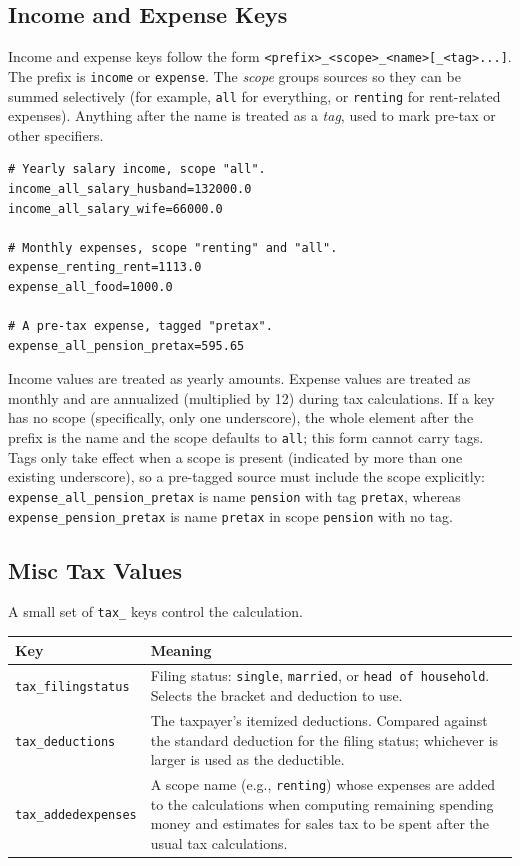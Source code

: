 \subsection{Income and Expense Keys}

Income and expense keys follow the form \texttt{<prefix>\_<scope>\_<name>[\_<tag>...]}. The prefix is \texttt{income} or \texttt{expense}. The \textit{scope} groups sources so they can be summed selectively (for example, \texttt{all} for everything, or \texttt{renting} for rent-related expenses). Anything after the name is treated as a \textit{tag}, used to mark pre-tax or other specifiers.

\begin{lstlisting}[style=pythonstyle]
# Yearly salary income, scope "all".
income_all_salary_husband=132000.0
income_all_salary_wife=66000.0

# Monthly expenses, scope "renting" and "all".
expense_renting_rent=1113.0
expense_all_food=1000.0

# A pre-tax expense, tagged "pretax".
expense_all_pension_pretax=595.65
\end{lstlisting}

Income values are treated as yearly amounts. Expense values are treated as monthly and are annualized (multiplied by 12) during tax calculations. If a key has no scope (specifically, only one underscore), the whole element after the prefix is the name and the scope defaults to \texttt{all}; this form cannot carry tags. Tags only take effect when a scope is present (indicated by more than one existing underscore), so a pre-tagged source must include the scope explicitly: \texttt{expense\_all\_pension\_pretax} is name \texttt{pension} with tag \texttt{pretax}, whereas \texttt{expense\_pension\_pretax} is name \texttt{pretax} in scope \texttt{pension} with no tag.

\subsection{Misc Tax Values}

A small set of \texttt{tax\_} keys control the calculation.

\begin{table}[h]
	\centering
	\label{tab:maple_misc_tax}
	\begin{tabularx}{\textwidth}{|l|X|}
		\hline
		\textbf{Key} & \textbf{Meaning} \\
		\hline
		\texttt{tax\_filingstatus} & Filing status: \texttt{single}, \texttt{married}, or \texttt{head of household}. Selects the bracket and deduction to use. \\
		\hline
		\texttt{tax\_deductions} & The taxpayer's itemized deductions. Compared against the standard deduction for the filing status; whichever is larger is used as the deductible. \\
		\hline
		\texttt{tax\_addedexpenses} & A scope name (e.g., \texttt{renting}) whose expenses are added to the calculations when computing remaining spending money and estimates for sales tax to be spent after the usual tax calculations. \\
		\hline
	\end{tabularx}
\end{table}

